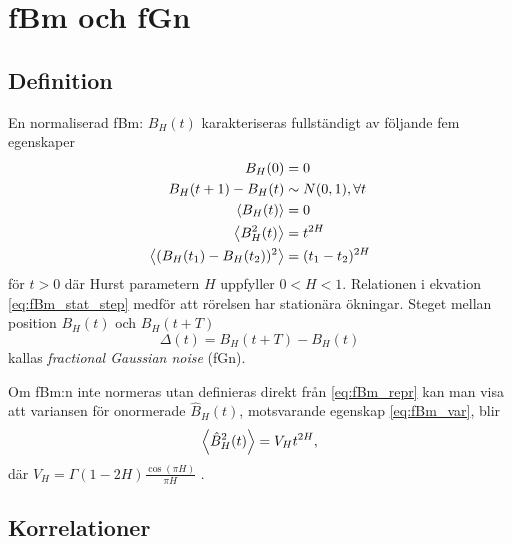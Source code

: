 \chapter{fBm och fGn}
\label{sec:App_fBm}

\section{Definition}

En normaliserad fBm: $B_H(t)$ karakteriseras fullständigt \cite{Dieker_fBm} av följande fem egenskaper
\begin{subequations}
\begin{align} 
    B_H(0)&=0 \\ 
    B_H(t+1)-B_H(t) &\sim N(0,1), \forall t \label{eq:fBm_normstep}\\
    \ev{B_H(t)}&=0 \label{eq:fBm_mean} \\
    \ev{B^2_H(t)}&=t^{2H} \label{eq:fBm_var}\\
    \ev{(B_H(t_1)-B_H(t_2))^2}&=(t_1-t_2)^{2H}  \label{eq:fBm_stat_step}\\
\end{align}
\end{subequations}
för $t>0$ där Hurst parametern $H$ uppfyller $0< H <1$.  Relationen i ekvation \eqref{eq:fBm_stat_step} medför att rörelsen har stationära ökningar. Steget mellan position $B_H(t)$ och $B_H(t+T)$
\begin{equation} \label{eq:fracGauss}
    \Delta(t) = B_H(t+T) - B_H(t)
\end{equation}
kallas \emph{fractional Gaussian noise} (fGn).

Om fBm:n inte normeras utan definieras direkt från \eqref{eq:fBm_repr} kan man visa att \cite{Dieker_fBm} variansen för onormerade $\hat{B}_H(t)$, motsvarande egenskap \eqref{eq:fBm_var}, blir 
\begin{equation} \label{eq:fBm_onorm_var}
    \ev{\hat{B}^2_H(t)} = V_H t^{2H},
\end{equation}
där $V_H = \Gamma(1-2H)\frac{\cos(\pi H)}{\pi H}$ \cite{Flandrin_fBmspektrum1989}.


\section{Korrelationer}

